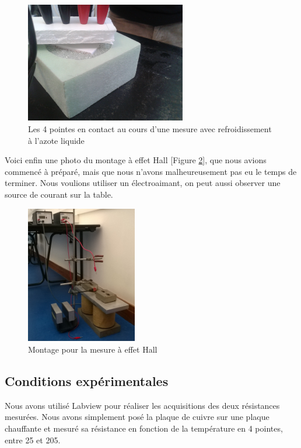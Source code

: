 \begin{figure}
  \begin{center}
		\includegraphics[width=7cm]{./images/photo5.jpg}
		\caption{Les 4 pointes en contact au cours d'une mesure avec refroidissement à l'azote liquide}
		\label{photo5}
	\end{center}
\end{figure}

Voici enfin une photo du montage à effet Hall [Figure \ref{photo_hall}], que nous avions commencé à préparé, 
mais que nous n'avons malheureusement pas eu le temps de terminer. Nous voulions utiliser un électroaimant, 
on peut aussi observer une source de courant sur la table. %

\begin{figure}[!t]
  \begin{center}
		\includegraphics[height=6cm]{./images/photo_hall.jpg}
		\caption{Montage pour la mesure à effet Hall}
		\label{photo_hall}
	\end{center}
\end{figure}

\newpage

\subsection{Conditions expérimentales}
Nous avons utilisé Labview pour réaliser les acquisitions des deux résistances mesurées.
Nous avons simplement posé la plaque de cuivre sur une plaque chauffante et mesuré sa résistance en fonction de la température en 4 pointes, entre 25\celsius{} et 205\celsius{}.


